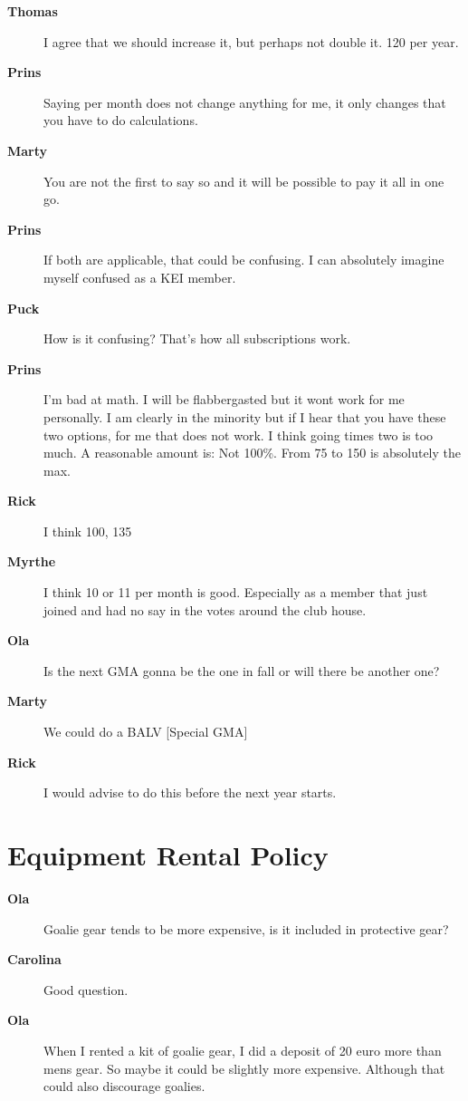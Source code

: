 \documentclass[12pt, a4paper]{article}
\newcommand{\speak}[2]{\begin{description}\item[\textbf{#1}]#2\end{description}}
\begin{document}

\speak{Thomas}{I agree that we should increase it, but perhaps not double it. 120 per year.}

\speak{Prins}{Saying per month does not change anything for me, it only changes that you have to do calculations.}

\speak{Marty}{You are not the first to say so and it will be possible to pay it all in one go.}

\speak{Prins}{If both are applicable, that could be confusing. I can absolutely imagine myself confused as a KEI member.}

\speak{Puck}{How is it confusing? That's how all subscriptions work.}

\speak{Prins}{I'm bad at math. I will be flabbergasted but it wont work for me personally. I am clearly in the minority but if I hear that you have these two options, for me that does not work. I think going times two is too much. A reasonable amount is: Not 100\%. From 75 to 150 is absolutely the max.}

\speak{Rick}{I think 100, 135}

\speak{Myrthe}{I think 10 or 11 per month is good. Especially as a member that just joined and had no say in the votes around the club house.}

\speak{Ola}{Is the next GMA gonna be the one in fall or will there be another one?}

\speak{Marty}{We could do a BALV [Special GMA]}

\speak{Rick}{I would advise to do this before the next year starts.}

\section{Equipment Rental Policy}


\speak{Ola}{Goalie gear tends to be more expensive, is it included in protective gear?}

\speak{Carolina}{Good question.}

\speak{Ola}{When I rented a kit of goalie gear, I did a deposit of 20 euro more than mens gear. So maybe it could be slightly more expensive. Although that could also discourage goalies.}
\end{document}
